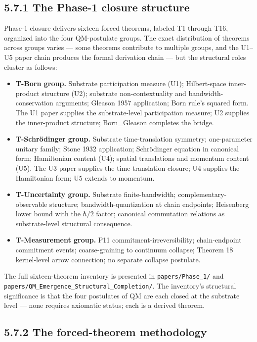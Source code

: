 \documentclass[11pt]{book}
\begin{document}
\subsection{5.7.1 The Phase-1 closure structure}

Phase-1 closure delivers sixteen forced theorems, labeled T1 through T16, organized into the four QM-postulate groups. The exact distribution of theorems across groups varies — some theorems contribute to multiple groups, and the U1–U5 paper chain produces the formal derivation chain — but the structural roles cluster as follows:

\begin{itemize}
\item \textbf{T-Born group.} Substrate participation measure (U1); Hilbert-space inner-product structure (U2); substrate non-contextuality and bandwidth-conservation arguments; Gleason 1957 application; Born rule's squared form. The U1 paper supplies the substrate-level participation measure; U2 supplies the inner-product structure; Born\_Gleason completes the bridge.
\item \textbf{T-Schrödinger group.} Substrate time-translation symmetry; one-parameter unitary family; Stone 1932 application; Schrödinger equation in canonical form; Hamiltonian content (U4); spatial translations and momentum content (U5). The U3 paper supplies the time-translation closure; U4 supplies the Hamiltonian form; U5 extends to momentum.
\item \textbf{T-Uncertainty group.} Substrate finite-bandwidth; complementary-observable structure; bandwidth-quantization at chain endpoints; Heisenberg lower bound with the $\hbar/2$ factor; canonical commutation relations as substrate-level structural consequence.
\item \textbf{T-Measurement group.} P11 commitment-irreversibility; chain-endpoint commitment events; coarse-graining to continuum collapse; Theorem 18 kernel-level arrow connection; no separate collapse postulate.
\end{itemize}

The full sixteen-theorem inventory is presented in \texttt{papers/Phase\_1/} and \texttt{papers/QM\_Emergence\_Structural\_Completion/}. The inventory's structural significance is that the four postulates of QM are each closed at the substrate level — none requires axiomatic status; each is a derived theorem.

\subsection{5.7.2 The forced-theorem methodology}
\end{document}
